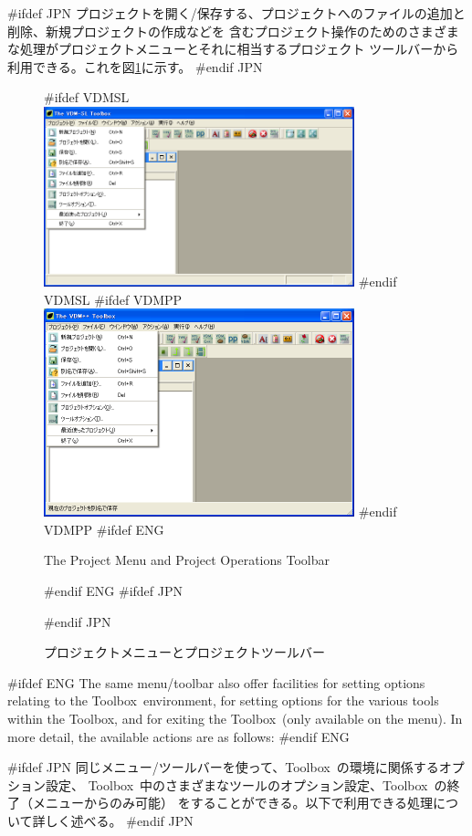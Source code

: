 \documentclass[\pformat,12pt]{article}
\newcommand{\Toolbox}{Toolbox}
\newcommand{\Toolbox}{Toolbox}
\newcommand{\guicmd}[1]{{\sf #1}}
\newcommand{\guicmd}[1]{{\gt #1}}
\begin{document}
#ifdef JPN
プロジェクトを開く/保存する、プロジェクトへのファイルの追加と削除、新規プロジェクトの作成などを
含むプロジェクト操作のためのさまざまな処理が\guicmd{プロジェクト}メニューとそれに相当する\guicmd{プロジェクト}
ツールバーから利用できる。これを図\ref{fig:projectMenuToolbar}に示す。
#endif JPN

\begin{figure}[tbh]
\begin{center}
\mbox{}
#ifdef VDMSL
\includegraphics[width=9cm]{projectMenuToolbar-sl.png}
#endif VDMSL
#ifdef VDMPP
\includegraphics[width=9cm]{projectMenuToolbar-pp.png}
#endif VDMPP
#ifdef ENG
\caption{The Project Menu and Project Operations Toolbar}
#endif ENG
#ifdef JPN
\caption{プロジェクトメニューとプロジェクトツールバー}
#endif JPN
\label{fig:projectMenuToolbar}
\end{center}
\end{figure}

#ifdef ENG
The same menu/toolbar also offer facilities for setting options
relating to the \Toolbox\ environment, for setting options for the
various tools within the \Toolbox, and for exiting the \Toolbox\
(only available on the menu). In more  detail, the available actions
are as follows:
#endif ENG

#ifdef JPN
同じメニュー/ツールバーを使って、\Toolbox\ の環境に関係するオプション設定、
\Toolbox\ 中のさまざまなツールのオプション設定、\Toolbox\ の終了（メニューからのみ可能）
をすることができる。以下で利用できる処理について詳しく述べる。
#endif JPN
\end{document}
